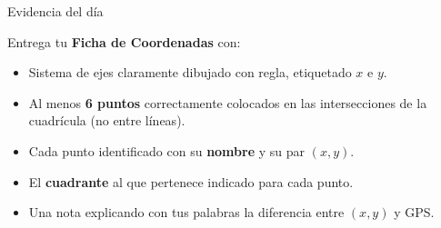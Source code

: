 \documentclass[aspectratio=169, 10pt, spanish]{beamer}
\begin{document}
\begin{frame}{Evidencia del día}
  \begin{evidenciabox}
    Entrega tu \textbf{Ficha de Coordenadas} con:
    \begin{itemize}
      \item Sistema de ejes claramente dibujado con regla,
            etiquetado $x$ e $y$.
      \item Al menos \textbf{6 puntos} correctamente colocados
            en las intersecciones de la cuadrícula
            (no entre líneas).
      \item Cada punto identificado con su \textbf{nombre}
            y su par $(x, y)$.
      \item El \textbf{cuadrante} al que pertenece indicado
            para cada punto.
      \item Una nota explicando con tus palabras
            la diferencia entre $(x, y)$ y GPS.
    \end{itemize}
  \end{evidenciabox}
\end{frame}
\end{document}
